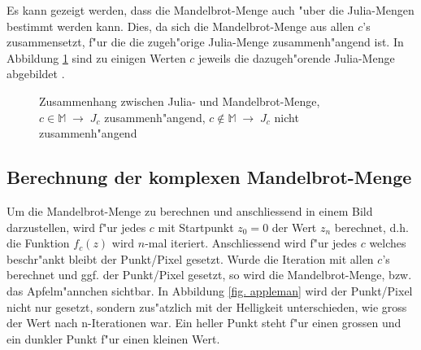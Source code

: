 \begin{refsection}
Es kann gezeigt werden, dass die Mandelbrot-Menge auch "uber die
Julia-Mengen bestimmt werden kann. Dies, da sich die Mandelbrot-Menge
aus allen $c$'s zusammensetzt, f"ur die die zugeh"orige Julia-Menge
zusammenh"angend ist. In Abbildung \ref{fig. julia_mandelbrot}
sind zu einigen Werten $c$ jeweils die dazugeh"orende Julia-Menge
abgebildet \cite{wiki}.

\begin{figure}[ht!]\centering
	\begin{adjustbox}{scale=0.5, keepaspectratio}
		
	\end{adjustbox}
	\caption{Zusammenhang zwischen Julia- und Mandelbrot-Menge, $c\in\mathbb{M}\;\rightarrow\; J_c$ zusammenh"angend, $c\notin\mathbb{M}\;\rightarrow\; J_c$ nicht zusammenh"angend \cite{julia}}
	\label{fig. julia_mandelbrot}
\end{figure}

\subsection{Berechnung der komplexen Mandelbrot-Menge}
Um die Mandelbrot-Menge zu berechnen und anschliessend in einem Bild
darzustellen, wird f"ur jedes $c$ mit Startpunkt $z_0=0$ der Wert $z_n$
berechnet, d.h. die Funktion $f_c(z)$ wird $n$-mal iteriert. Anschliessend
wird f"ur jedes $c$ welches beschr"ankt bleibt der Punkt/Pixel
gesetzt. Wurde die Iteration mit allen $c$'s berechnet und ggf. der
Punkt/Pixel gesetzt, so wird die Mandelbrot-Menge, bzw. das Apfelm"annchen
sichtbar. In Abbildung \ref{fig. appleman} wird der Punkt/Pixel nicht
nur gesetzt, sondern zus"atzlich mit der Helligkeit unterschieden, wie
gross der Wert nach n-Iterationen war. Ein heller Punkt steht f"ur einen
grossen und ein dunkler Punkt f"ur einen kleinen Wert.


\end{refsection}
